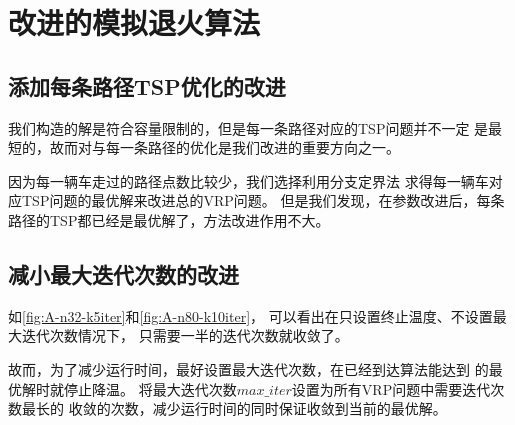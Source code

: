\documentclass{nudt}
\begin{document}
\section{改进的模拟退火算法}
\subsection{添加每条路径TSP优化的改进} 
我们构造的解是符合容量限制的，但是每一条路径对应的TSP问题并不一定
是最短的，故而对与每一条路径的优化是我们改进的重要方向之一。

因为每一辆车走过的路径点数比较少，我们选择利用分支定界法
求得每一辆车对应TSP问题的最优解来改进总的VRP问题。
但是我们发现，在参数改进后，每条路径的TSP都已经是最优解了，方法改进作用不大。

\subsection{减小最大迭代次数的改进}
如\cref{fig:A-n32-k5iter}和\cref{fig:A-n80-k10iter}，
可以看出在只设置终止温度、不设置最大迭代次数情况下，
只需要一半的迭代次数就收敛了。

故而，为了减少运行时间，最好设置最大迭代次数，在已经到达算法能达到
的最优解时就停止降温。
将最大迭代次数$max\_iter$设置为所有VRP问题中需要迭代次数最长的
收敛的次数，减少运行时间的同时保证收敛到当前的最优解。
\end{document}
